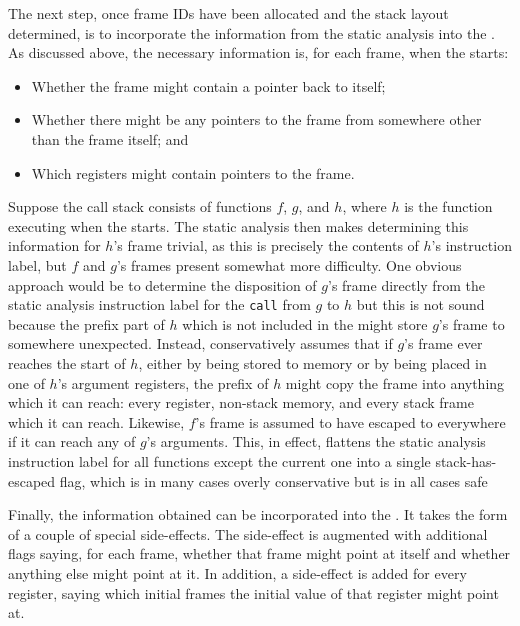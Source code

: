 
The next step, once frame IDs have been allocated and the stack layout
determined, is to incorporate the information from the static analysis
into the {\StateMachine}.  As discussed above, the necessary
information is, for each frame, when the {\StateMachine} starts:

\begin{itemize}
\item
  Whether the frame might contain a pointer back to itself;
\item
  Whether there might be any pointers to the frame from somewhere
  other than the frame itself; and
\item
  Which registers might contain pointers to the frame.
\end{itemize}

Suppose the call stack consists of functions $f$, $g$, and $h$, where
$h$ is the function executing when the {\StateMachine} starts.  The
static analysis then makes determining this information for $h$'s
frame trivial, as this is precisely the contents of $h$'s instruction
label, but $f$ and $g$'s
frames present somewhat more difficulty.  One obvious approach would
be to determine the disposition of $g$'s frame directly from the
static analysis instruction label for the \verb|call| from $g$ to $h$
but this is not sound because the prefix part of $h$ which is not
included in the {\StateMachine} might store $g$'s frame to somewhere
unexpected.  Instead, {\technique} conservatively assumes that if
$g$'s frame ever reaches the start of $h$, either by being stored to
memory or by being placed in one of $h$'s argument registers, the
prefix of $h$ might copy the frame into anything which it can reach:
every register, non-stack memory, and every stack frame which it can
reach.  Likewise, $f$'s frame is assumed to have escaped to everywhere
if it can reach any of $g$'s arguments.  This, in effect, flattens the
static analysis instruction label for all functions except the current
one into a single stack-has-escaped flag, which is in many cases
overly conservative but is in all cases safe

Finally, the information obtained can be incorporated into the
{\StateMachine}.  It takes the form of a couple of special
side-effects.  The  side-effect is augmented with
additional flags saying, for each frame, whether that frame might
point at itself and whether anything else might point at it.  In
addition, a  side-effect is added for every register,
saying which initial frames the initial value of that register might
point at.

